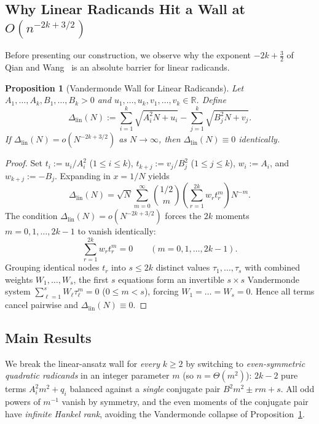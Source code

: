\documentclass[11pt,a4paper]{article}
\newtheorem{proposition}[theorem]{Proposition}
\theoremstyle{definition}
\theoremstyle{remark}
\newcommand{\RR}{\mathbb{R}}
\begin{document}
\subsection{Why Linear Radicands Hit a Wall at $O(n^{-2k + 3/2})$}

Before presenting our construction, we observe why the exponent $-2k + \frac{3}{2}$ of Qian and Wang~\cite{QianWang2006} is an absolute barrier for linear radicands.

\begin{proposition}[Vandermonde Wall for Linear Radicands]
\label{prop:linear-wall}
Let $A_1, \dots, A_k, B_1, \dots, B_k > 0$ and $u_1, \dots, u_k, v_1, \dots, v_k \in \RR$. Define
\[
\Delta_{\mathrm{lin}}(N) := \sum_{i=1}^k \sqrt{A_i^2 N + u_i} - \sum_{j=1}^k \sqrt{B_j^2 N + v_j}.
\]
If $\Delta_{\mathrm{lin}}(N) = o\!\left(N^{-2k + 3/2}\right)$ as $N \to \infty$, then $\Delta_{\mathrm{lin}}(N) \equiv 0$ identically.
\end{proposition}

\begin{proof}
Set $t_i := u_i / A_i^2$ ($1 \le i \le k$), $t_{k+j} := v_j / B_j^2$ ($1 \le j \le k$), $w_i := A_i$, and $w_{k+j} := -B_j$. Expanding in $x = 1/N$ yields
\[
\Delta_{\mathrm{lin}}(N) = \sqrt{N} \sum_{m=0}^{\infty} \binom{1/2}{m} \left(\sum_{r=1}^{2k} w_r t_r^m\right) N^{-m}.
\]
The condition $\Delta_{\mathrm{lin}}(N) = o(N^{-2k + 3/2})$ forces the $2k$ moments $m = 0, 1, \dots, 2k - 1$ to vanish identically:
\[
\sum_{r=1}^{2k} w_r t_r^m = 0 \qquad (m = 0, 1, \dots, 2k - 1).
\]
Grouping identical nodes $t_r$ into $s \le 2k$ distinct values $\tau_1, \dots, \tau_s$ with combined weights $W_1, \dots, W_s$, the first $s$ equations form an invertible $s \times s$ Vandermonde system $\sum_{\ell=1}^s W_\ell \tau_\ell^m = 0$ ($0 \le m < s$), forcing $W_1 = \dots = W_s = 0$. Hence all terms cancel pairwise and $\Delta_{\mathrm{lin}}(N) \equiv 0$.
\end{proof}

\subsection{Main Results}

We break the linear-ansatz wall for \emph{every} $k \ge 2$ by switching to \emph{even-symmetric quadratic radicands} in an integer parameter $m$ (so $n = \Theta(m^2)$): $2k - 2$ pure terms $A_i^2 m^2 + q_i$ balanced against a \emph{single} conjugate pair $B^2 m^2 \pm r m + s$. All odd powers of $m^{-1}$ vanish by symmetry, and the even moments of the conjugate pair have \emph{infinite Hankel rank}, avoiding the Vandermonde collapse of Proposition~\ref{prop:linear-wall}.
\end{document}
